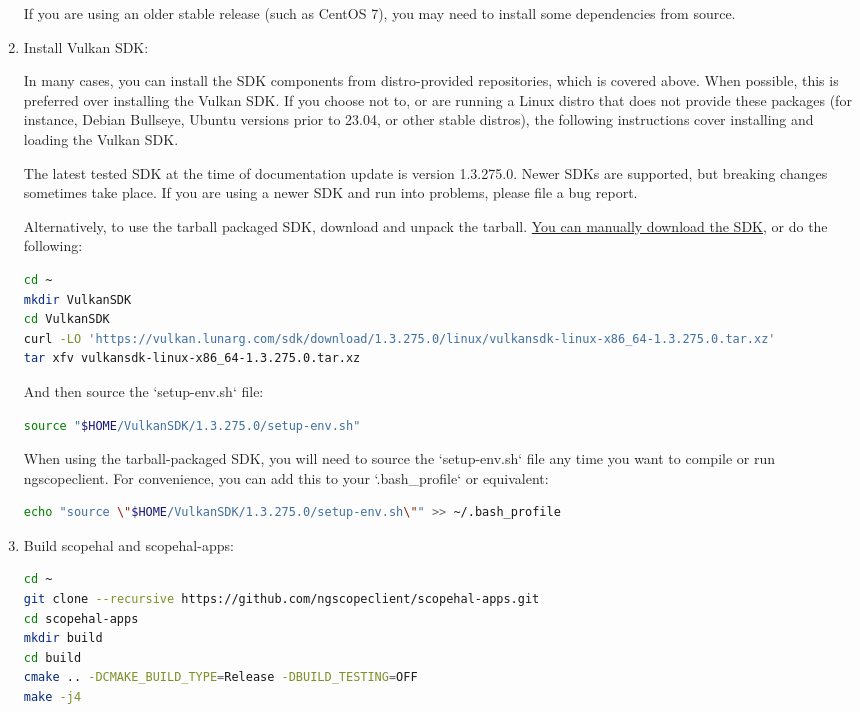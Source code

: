 \begin{enumerate}
If you are using an older stable release (such as CentOS 7), you may need to install some dependencies from source.

\item Install Vulkan SDK:

In many cases, you can install the SDK components from distro-provided repositories, which is covered above. When
possible, this is preferred over installing the Vulkan SDK. If you choose not to, or are running a Linux distro that
does not provide these packages (for instance, Debian Bullseye, Ubuntu versions prior to 23.04, or other stable
distros), the following instructions cover installing and loading the Vulkan SDK.

The latest tested SDK at the time of documentation update is version 1.3.275.0. Newer SDKs are supported, but breaking
changes sometimes take place.
If you are using a newer SDK and run into problems, please file a bug report.

Alternatively, to use the tarball packaged SDK, download and unpack the tarball.
\href{https://vulkan.lunarg.com/sdk/home}{You can manually download the SDK}, or do the following:
\begin{lstlisting}[language=sh, numbers=none]
cd ~
mkdir VulkanSDK
cd VulkanSDK
curl -LO 'https://vulkan.lunarg.com/sdk/download/1.3.275.0/linux/vulkansdk-linux-x86_64-1.3.275.0.tar.xz'
tar xfv vulkansdk-linux-x86_64-1.3.275.0.tar.xz
\end{lstlisting}

And then source the `setup-env.sh` file:
\begin{lstlisting}[language=sh, numbers=none]
source "$HOME/VulkanSDK/1.3.275.0/setup-env.sh"
\end{lstlisting}

When using the tarball-packaged SDK, you will need to source the `setup-env.sh` file any time you want to compile
or run ngscopeclient. For convenience, you can add this to your `.bash\_profile` or equivalent:
\begin{lstlisting}[language=sh, numbers=none]
echo "source \"$HOME/VulkanSDK/1.3.275.0/setup-env.sh\"" >> ~/.bash_profile
\end{lstlisting}

\item Build scopehal and scopehal-apps:

\begin{lstlisting}[language=sh, numbers=none]
cd ~
git clone --recursive https://github.com/ngscopeclient/scopehal-apps.git
cd scopehal-apps
mkdir build
cd build
cmake .. -DCMAKE_BUILD_TYPE=Release -DBUILD_TESTING=OFF
make -j4
\end{lstlisting}

\end{enumerate}

